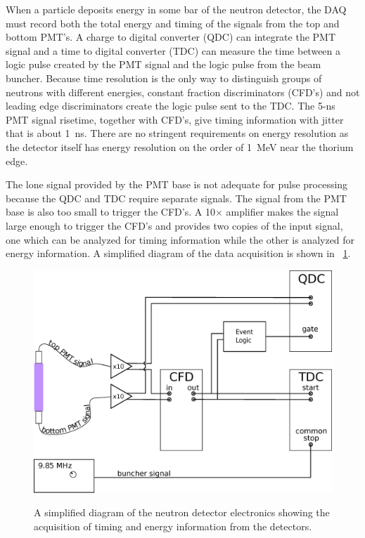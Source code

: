  When a particle deposits energy in some bar of the neutron detector, the DAQ must record both the total energy and timing of the signals from the top and bottom PMT's.  A charge to digital converter (QDC) can integrate the PMT signal and a time to digital converter (TDC) can measure the time between a logic pulse created by the PMT signal and the logic pulse from the beam buncher.  Because time resolution is the only way to distinguish groups of neutrons with different energies, constant fraction discriminators (CFD's) and not leading edge discriminators create the logic pulse sent to the TDC.  The 5-ns PMT signal risetime, together with CFD's, give timing information with jitter that is about 1~ns.  There are no stringent requirements on energy resolution as the detector itself has energy resolution on the order of 1~MeV near the thorium edge.

The lone signal provided by the PMT base is not adequate for pulse processing because the QDC and TDC require separate signals.  The signal from the PMT base is also too small to trigger the CFD's.  A 10$\times$ amplifier makes the signal large enough to trigger the CFD's and provides two copies of the input signal, one which can be analyzed for timing information while the other is analyzed for energy information.  A simplified diagram of the data acquisition is shown in \fig~\ref{fig:simpleElectronics}.

\begin{figure}[htp]
\centering
\includegraphics[width=1.0\textwidth]{figures/basic_electronics.eps}
\label{fig:simpleElectronics}
\caption{A simplified diagram of the neutron detector electronics showing the acquisition of timing and energy information from the detectors.}
\end{figure}

